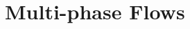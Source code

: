 \documentclass[a4paper]{book}
\begin{document}
  \chapter{Multi-phase Flows}
  
    
    
  
  

  \printindex
\end{document}

